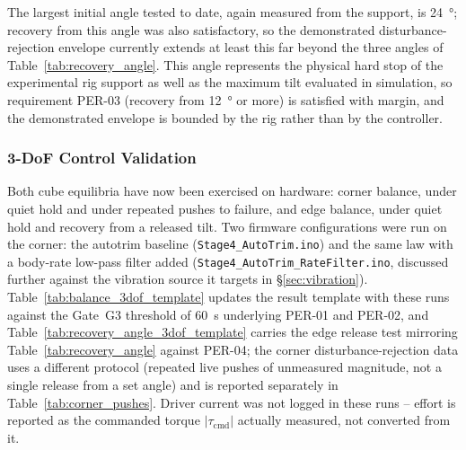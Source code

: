 The largest initial angle tested to date, again measured from the support, is
\qty{24}{\degree}; recovery from this angle was also satisfactory, so the
demonstrated disturbance-rejection envelope currently extends at least this
far beyond the three angles of Table~\ref{tab:recovery_angle}. This angle represents
the physical hard stop of the experimental rig support as well as the maximum tilt
evaluated in simulation, so requirement PER-03 (recovery from
\qty{12}{\degree} or more) is satisfied with margin, and the demonstrated
envelope is bounded by the rig rather than by the controller.

\subsubsection{3-DoF Control Validation}
\label{sec:test_3dof}

Both cube equilibria have now been exercised on hardware: corner balance,
under quiet hold and under repeated pushes to failure, and edge balance,
under quiet hold and recovery from a released tilt. Two firmware
configurations were run on the corner: the autotrim baseline
(\texttt{Stage4\_AutoTrim.ino}) and the same law with a body-rate low-pass
filter added (\texttt{Stage4\_AutoTrim\_RateFilter.ino}, discussed further
against the vibration source it targets in \S\ref{sec:vibration}).
Table~\ref{tab:balance_3dof_template} updates the result template with these
runs against the Gate~G3 threshold of \qty{60}{\second} underlying PER-01 and
PER-02, and Table~\ref{tab:recovery_angle_3dof_template} carries the edge
release test mirroring Table~\ref{tab:recovery_angle} against PER-04; the
corner disturbance-rejection data uses a different protocol (repeated live
pushes of unmeasured magnitude, not a single release from a set angle) and is
reported separately in Table~\ref{tab:corner_pushes}. Driver current was not
logged in these runs -- effort is reported as the commanded torque
$|\tau_{\text{cmd}}|$ actually measured, not converted from it.

